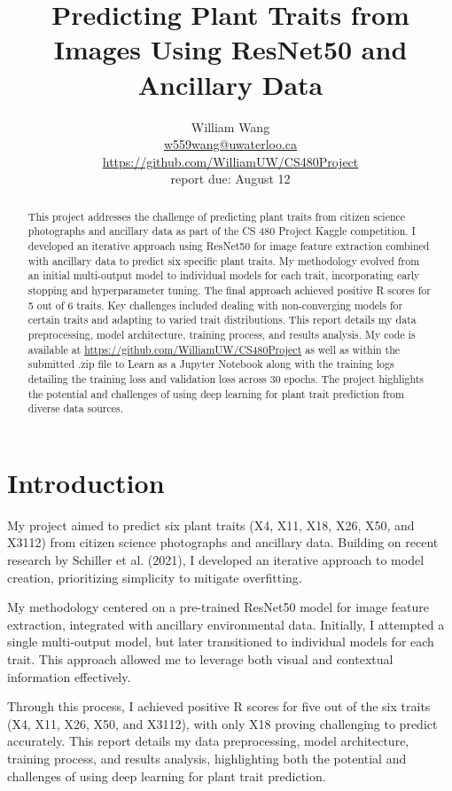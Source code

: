 \documentclass{article}
\title{Predicting Plant Traits from Images Using ResNet50 and Ancillary Data}
\author{
	William Wang \\
	\url{w559wang@uwaterloo.ca} \\
        \url{https://github.com/WilliamUW/CS480Project} \\
	{\color{red} report due: August 12}
}
\begin{document}
\maketitle

\begin{abstract} 
This project addresses the challenge of predicting plant traits from citizen science photographs and ancillary data as part of the CS 480 Project Kaggle competition. I developed an iterative approach using ResNet50 for image feature extraction combined with ancillary data to predict six specific plant traits. My methodology evolved from an initial multi-output model to individual models for each trait, incorporating early stopping and hyperparameter tuning. The final approach achieved positive R scores for 5 out of 6 traits. Key challenges included dealing with non-converging models for certain traits and adapting to varied trait distributions. This report details my data preprocessing, model architecture, training process, and results analysis. My code is available at \url{https://github.com/WilliamUW/CS480Project} as well as within the submitted .zip file to Learn as a Jupyter Notebook along with the training logs detailing the training loss and validation loss across 30 epochs. The project highlights the potential and challenges of using deep learning for plant trait prediction from diverse data sources.
\end{abstract} 

\section{Introduction}
My project aimed to predict six plant traits (X4, X11, X18, X26, X50, and X3112) from citizen science photographs and ancillary data. Building on recent research by Schiller et al. (2021), I developed an iterative approach to model creation, prioritizing simplicity to mitigate overfitting.

My methodology centered on a pre-trained ResNet50 model for image feature extraction, integrated with ancillary environmental data. Initially, I attempted a single multi-output model, but later transitioned to individual models for each trait. This approach allowed me to leverage both visual and contextual information effectively.

Through this process, I achieved positive R scores for five out of the six traits (X4, X11, X26, X50, and X3112), with only X18 proving challenging to predict accurately. This report details my data preprocessing, model architecture, training process, and results analysis, highlighting both the potential and challenges of using deep learning for plant trait prediction.
\end{document}
